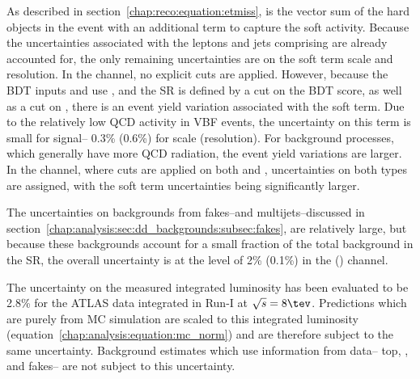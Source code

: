 As described in section~\ref{chap:reco:equation:etmiss}, \etmiss is
the vector sum of the hard objects in the event with an additional
term to capture the soft activity. Because the uncertainties associated with
the leptons and jets comprising \etmiss are already accounted for, the
only remaining uncertainties are on the soft term scale and
resolution. In the \emme channel, no explicit \etmiss cuts are
applied. However, because the BDT inputs \pttot and \mt use \trkmet,
and the SR is defined by a cut on the BDT score, as well as a cut
on \mtt, there is an event yield variation associated with the \trkmet
soft term. Due to the relatively low QCD activity in VBF events, the
uncertainty on this term is small for signal-- 0.3\% (0.6\%) for scale
(resolution). For background processes, which generally have more QCD
radiation, the event yield variations are larger. In the \eemm
channel, where cuts are applied on both \trkmet and \calomet,
uncertainties on both \etmiss types are assigned, with the \trkmet
soft term uncertainties being significantly larger.

The uncertainties on backgrounds from fakes--\wjets and
multijets--discussed in
section~\ref{chap:analysis:sec:dd_backgrounds:subsec:fakes}, are
relatively large, but because these backgrounds account for a small
fraction of the total background in the SR, the overall uncertainty is
at the level of 2\% (0.1\%) in the \emme (\eemm) channel. 

The uncertainty on the measured integrated luminosity has been
evaluated to be 2.8\% for the ATLAS data integrated in Run-I at
$\sqrts = 8 \tev$. Predictions which are purely from MC simulation are
scaled to this integrated luminosity
(equation~\ref{chap:analysis:equation:mc_norm}) and are therefore
subject to the same uncertainty. Background estimates which use
information from data-- top, \ZDY, and fakes-- are not subject to
this uncertainty. 

%
%


